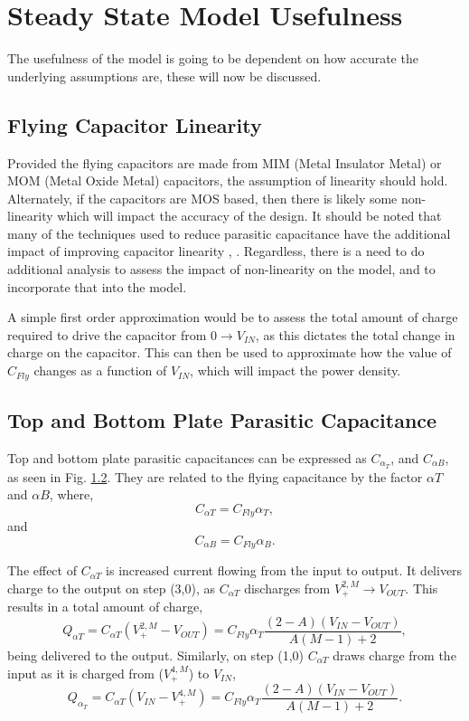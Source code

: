 \documentclass[conference]{article}
\begin{document}
 	\section{Steady State Model Usefulness}
 	The usefulness of the model is going to be dependent on how accurate the underlying assumptions are, these will now be discussed. 
 	\subsection{Flying Capacitor Linearity}
 	Provided the flying capacitors are made from MIM (Metal Insulator Metal) or MOM (Metal Oxide Metal) capacitors, the assumption of linearity should hold. Alternately, if the capacitors are MOS based, then there is likely some non-linearity which will impact the accuracy of the design. It should be noted that many of the techniques used to reduce parasitic capacitance have the additional impact of improving capacitor linearity \cite{}, \cite{}. Regardless, there is a need to do additional analysis to assess the impact of non-linearity on the model, and to incorporate that into the model.
 	
 	A simple first order approximation would be to assess the total amount of charge required to drive the capacitor from $0 \rightarrow V_{IN}$, as this dictates the total change in charge on the capacitor. This can then be used to approximate how the value of $C_{Fly}$ changes as a function of $V_{IN}$, which will impact the power density. 
 	
 	\subsection{Top and Bottom Plate Parasitic Capacitance}
 	Top and bottom plate parasitic capacitances can be expressed as $C_{\alpha_T}$, and $C_{\alpha B}$, as seen in Fig. \ref{}. They are related to the flying capacitance by the factor $\alpha T$ and $\alpha B$, where,
 	\begin{equation}
 	C_{\alpha T} = C_{Fly}\alpha_T,
 	\end{equation}
 	and
 	\begin{equation}
 	C_{\alpha B} = C_{Fly}\alpha_B.
 	\end{equation}
 	
 	The effect of $C_{\alpha T}$ is increased current flowing from the input to output. It delivers charge to the output on step (3,0), as $C_{\alpha T}$ discharges from $V_{+}^{2,M} \rightarrow V_{OUT}$. This results in a total amount of charge,
 	\begin{equation}
 	Q_{\alpha T} = C_{\alpha T}(V_{+}^{2,M} - V_{OUT}) = C_{Fly}\alpha_T\frac{(2 - A)(V_{IN} - V_{OUT})}{A(M-1) + 2},
 	\end{equation}
 	being delivered to the output. Similarly, on step (1,0) $C_{\alpha T}$ draws charge from the input as it is charged from ($V_{+}^{4,M}$) to $V_{IN}$, 
 	\begin{equation}
 	Q_{\alpha_T} = C_{\alpha T}(V_{IN} - V_{+}^{4,M}) = C_{Fly}\alpha_{T}\frac{(2 - A)(V_{IN} - V_{OUT})}{A(M-1) + 2}.
 	\end{equation}
 	
\end{document}
